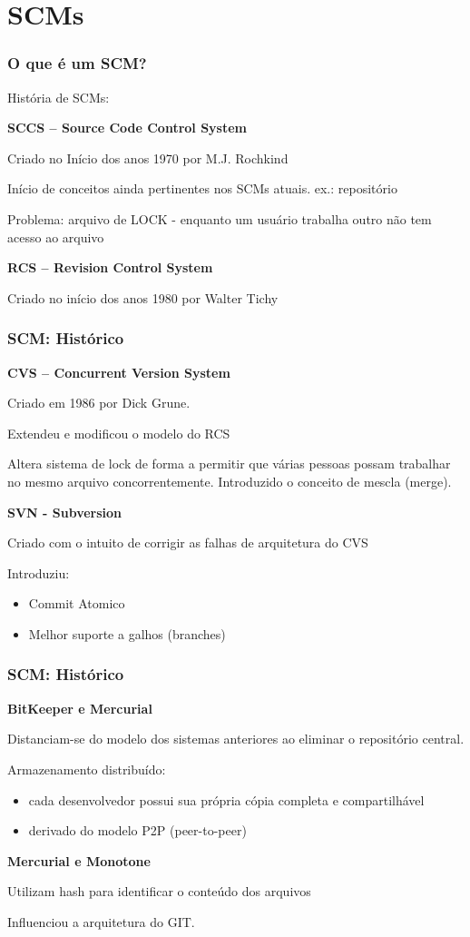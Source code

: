 \section{SCMs}

\begin{frame}
\frametitle{O que é um SCM?}

História de SCMs:

\textbf{SCCS – Source Code Control System}

Criado no Início dos anos 1970 por M.J. Rochkind

Início de conceitos ainda pertinentes nos SCMs atuais. ex.: repositório

Problema: arquivo de LOCK - enquanto um usuário trabalha outro não tem acesso ao arquivo

\textbf{RCS – Revision Control System}

Criado no início dos anos 1980 por Walter Tichy

\end{frame}


\begin{frame}
\frametitle{SCM: Histórico}

\textbf{CVS – Concurrent Version System}

Criado em 1986 por Dick Grune.

Extendeu e modificou o modelo do RCS

Altera sistema de lock de forma a permitir que várias pessoas possam trabalhar no mesmo arquivo concorrentemente. Introduzido o conceito de mescla (merge).

\textbf{SVN - Subversion }

Criado com o intuito de corrigir as falhas de arquitetura do CVS

Introduziu:
\begin{itemize}
\item Commit Atomico
\item Melhor suporte a galhos (branches)
\end{itemize}


\end{frame}

\begin{frame}
\frametitle{SCM: Histórico}

\textbf{BitKeeper e Mercurial}

Distanciam-se do modelo dos sistemas anteriores ao eliminar o repositório central. 

Armazenamento distribuído:

\begin{itemize}
\item cada desenvolvedor possui sua própria cópia completa e compartilhável
\item derivado do modelo P2P (peer-to-peer)
\end{itemize}

\textbf{Mercurial e Monotone}

Utilizam hash para identificar o conteúdo dos arquivos 

Influenciou a arquitetura do GIT.
\end{frame}

